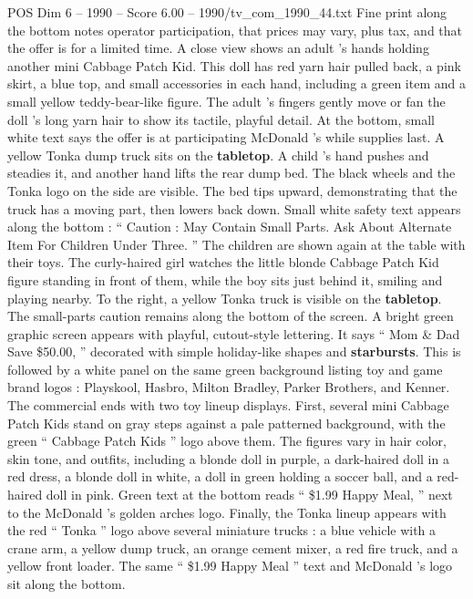 \begin{textsample}{POS Dim 6 – 1990 – Score 6.00 – 1990/tv\_com\_1990\_44.txt}
Fine print along the bottom notes operator participation, that prices may vary, plus tax, and that the offer is for a limited time.
A close view shows an adult ’s hands holding another mini Cabbage Patch Kid.
This doll has red yarn hair pulled back, a pink skirt, a blue top, and small accessories in each hand, including a green item and a small yellow teddy-bear-like figure.
The adult ’s fingers gently move or fan the doll ’s long yarn hair to show its tactile, playful detail.
At the bottom, small white text says the offer is at participating McDonald ’s while supplies last.
A yellow Tonka dump truck sits on the \textbf{tabletop}.
A child ’s hand pushes and steadies it, and another hand lifts the rear dump bed.
The black wheels and the Tonka logo on the side are visible.
The bed tips upward, demonstrating that the truck has a moving part, then lowers back down.
Small white safety text appears along the bottom : “ Caution : May Contain Small Parts.
Ask About Alternate Item For Children Under Three. ” The children are shown again at the table with their toys.
The curly-haired girl watches the little blonde Cabbage Patch Kid figure standing in front of them, while the boy sits just behind it, smiling and playing nearby.
To the right, a yellow Tonka truck is visible on the \textbf{tabletop}.
The small-parts caution remains along the bottom of the screen.
A bright green graphic screen appears with playful, cutout-style lettering.
It says “ Mom \& Dad Save \$50.00, ” decorated with simple holiday-like shapes and \textbf{starbursts}.
This is followed by a white panel on the same green background listing toy and game brand logos : Playskool, Hasbro, Milton Bradley, Parker Brothers, and Kenner.
The commercial ends with two toy lineup displays.
First, several mini Cabbage Patch Kids stand on gray steps against a pale patterned background, with the green “ Cabbage Patch Kids ” logo above them.
The figures vary in hair color, skin tone, and outfits, including a blonde doll in purple, a dark-haired doll in a red dress, a blonde doll in white, a doll in green holding a soccer ball, and a red-haired doll in pink.
Green text at the bottom reads “ \$1.99 Happy Meal, ” next to the McDonald ’s golden arches logo.
Finally, the Tonka lineup appears with the red “ Tonka ” logo above several miniature trucks : a blue vehicle with a crane arm, a yellow dump truck, an orange cement mixer, a red fire truck, and a yellow front loader.
The same “ \$1.99 Happy Meal ” text and McDonald ’s logo sit along the bottom.

\end{textsample}
